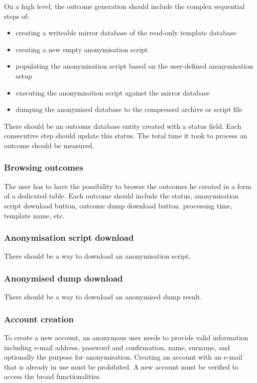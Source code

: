 \documentclass[a4paper,twoside,12pt]{book}
\begin{document}
On a high level, the outcome generation should include the complex sequential steps of:
\begin{itemize}
\item creating a writeable mirror database of the read-only template database
\item creating a new empty anonymisation script
\item populating the anonymisation script based on the user-defined anonymisation setup
\item executing the anonymisation script against the mirror database
\item dumping the anonymised database to the compressed archive or script file
\end{itemize} 

There should be an outcome database entity created with a status field. Each consecutive step should update this status. The total time it took to process an outcome should be measured.

\subsubsection{Browsing outcomes}

The user has to have the possibility to browse the outcomes he created in a form of a dedicated table. Each outcome should include the status, anonymisation script download button, outcome dump download button. processing time, template name, etc.

\subsubsection{Anonymisation script download}

There should be a way to download an anonymisation script.

\subsubsection{Anonymised dump download}

There should be a way to download an anonymised dump result.

\subsubsection{Account creation}

To create a new account, an anonymous user needs to provide valid information including e-mail address, password and confirmation, name, surname, and optionally the purpose for anonymisation. Creating an account with an e-mail that is already in use must be prohibited. A new account must be verified to access the broad functionalities.
\end{document}
